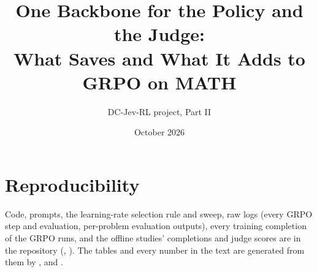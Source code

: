 \documentclass[11pt]{article}
\title{One Backbone for the Policy and the Judge:\\What \kev{} Saves and What It Adds to GRPO on MATH}
\author{DC-Jev-RL project, Part II}
\date{October 2026}
\begin{document}
\maketitle

\begin{abstract}

\end{abstract}








\section*{Reproducibility}
Code, prompts, the learning-rate selection rule and sweep, raw logs (every GRPO step and evaluation, per-problem
evaluation outputs), every training completion of the GRPO runs, and the offline studies' completions and judge scores
are in the repository
(, ). The tables and every number in the text are
generated from them by ,  and
.



\end{document}
